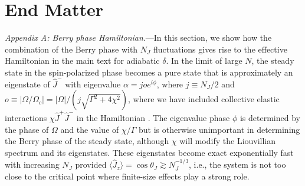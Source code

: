 \documentclass[11pt]{article}
\newcommand{\twocolumngrid}{}
\begin{document}
\section{\large{End Matter}}

\twocolumngrid

\emph{Appendix A: Berry phase Hamiltonian}.---In this section, we show how the combination of the Berry phase with $N_J$ fluctuations gives rise to the effective Hamiltonian in the main text for adiabatic $\delta$. 
In the limit of large $N$, the steady state in the spin-polarized phase becomes a pure state that is approximately an eigenstate of $\hat J^-$ with eigenvalue $\alpha = j o e^{i \phi}$, where $j \equiv N_J/2$ and $o \equiv |\Omega/\Omega_c| = |\Omega|/(j \sqrt{\Gamma^2 + 4 \chi^2})$, where we have included collective elastic interactions $\chi \hat J^+ \hat J^-$ in the Hamiltonian \cite{Somech2024}. The eigenvalue phase $\phi$ is determined by the phase of $\Omega$ and the value of $\chi/\Gamma$ but is otherwise unimportant in determining the Berry phase of the steady state, although $\chi$ will modify the Liouvillian spectrum and its eigenstates. These eigenstates become exact exponentially fast with increasing $N_J$ provided $\langle \hat J_z \rangle = \cos \theta_J \gtrsim N_J^{-1/3}$, i.e., the system is not too close to the critical point where finite-size effects play a strong role. 
 
\end{document}
